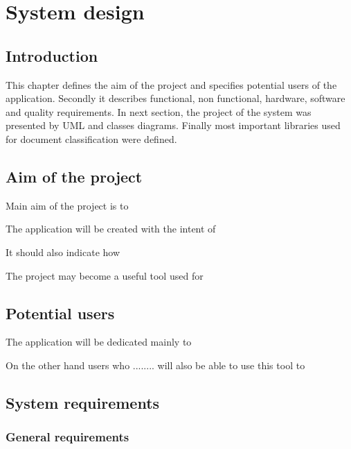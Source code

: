 \chapter{System design}
\label{des}
\section{Introduction}
This chapter defines the aim of the project and specifies potential users of the application. Secondly it describes functional, non functional, hardware, software and quality requirements. In next section, the project of the system was presented by UML and classes diagrams. Finally most important libraries used for document classification were defined. 


\section{Aim of the project}

Main aim of the project is to 

The application will be created with the intent of 

It should also indicate how 

The project may become a useful tool used for 



\section{Potential users}
\label{users}

The application will be dedicated mainly to 

On the other hand users who ........ will also be able to use this tool to 


\section{System requirements}

\subsection{General requirements}

